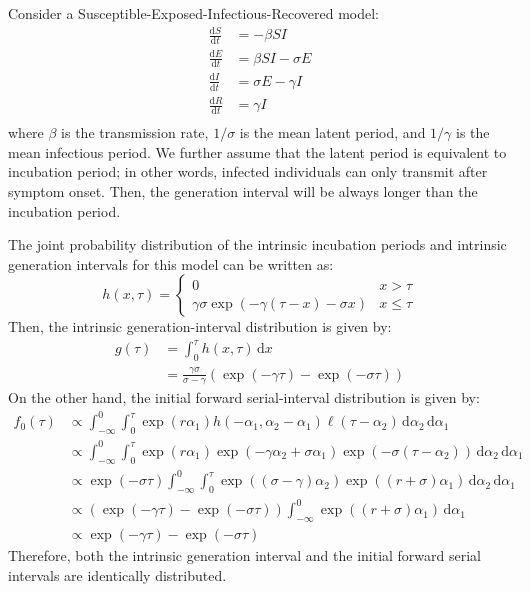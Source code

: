 \documentclass[12pt]{article}
\newcommand{\dd}[1]{\ensuremath{\, \mathrm{d}#1}}
\newcommand{\dx}{\dd{x}}
\newcommand{\pinf}{\ensuremath{\alpha_1}} %
\newcommand{\sinf}{\ensuremath{\alpha_2}} %
\newcommand{\idist}{\ell} %
\begin{document}
Consider a Susceptible-Exposed-Infectious-Recovered model:
\begin{equation}
\begin{aligned}
\frac{\mathrm{d}S}{\mathrm{d}t} &= - \beta S I\\
\frac{\mathrm{d}E}{\mathrm{d}t} &= \beta S I - \sigma E\\
\frac{\mathrm{d}I}{\mathrm{d}t} &= \sigma E - \gamma I \\
\frac{\mathrm{d}R}{\mathrm{d}t} &= \gamma I \\
\end{aligned}
\end{equation}
where $\beta$ is the transmission rate, $1/\sigma$ is the mean latent period, and $1/\gamma$ is the mean infectious period.
We further assume that the latent period is equivalent to incubation period; in other words, infected individuals can only transmit after symptom onset.
Then, the generation interval will be always longer than the incubation period.

The joint probability distribution of the intrinsic incubation periods and intrinsic generation intervals for this model can be written as:
\begin{equation}
h(x, \tau) = \begin{cases}
0 & x > \tau\\
\gamma \sigma \exp(-\gamma (\tau-x)-\sigma x) & x \leq \tau
\end{cases}
\end{equation}
Then, the intrinsic generation-interval distribution is given by:
\begin{equation}
\begin{aligned}
g(\tau) &= \int_0^\tau h(x, \tau) \dx\\
&= \frac{\gamma \sigma}{\sigma-\gamma} (\exp(-\gamma \tau) - \exp(-\sigma \tau))
\end{aligned}
\end{equation}
On the other hand, the initial forward serial-interval distribution is given by:
\begin{equation}
\begin{aligned}
f_{0}(\tau) &\propto \int_{-\infty}^{0} \int_{0}^{\tau} \exp(r \pinf) h(-\pinf, \sinf - \pinf) \idist(\tau - \sinf) \, \mathrm{d}\sinf\,\mathrm{d}\pinf\\
&\propto \int_{-\infty}^{0} \int_{0}^{\tau}\exp(r \pinf) \exp(-\gamma \sinf+ \sigma \pinf) \exp(-\sigma(\tau-\sinf)) \, \mathrm{d}\sinf\,\mathrm{d}\pinf\\
&\propto  \exp(-\sigma \tau) \int_{-\infty}^{0} \int_{0}^{\tau} \exp((\sigma-\gamma) \sinf) \exp((r+ \sigma) \pinf)\, \mathrm{d}\sinf\,\mathrm{d}\pinf\\
&\propto  (\exp(-\gamma \tau) - \exp(-\sigma \tau)) \int_{-\infty}^{0} \exp((r+ \sigma) \pinf)\,\mathrm{d}\pinf\\
&\propto  \exp(-\gamma \tau) - \exp(-\sigma \tau)
\end{aligned}
\end{equation}
Therefore, both the intrinsic generation interval and the initial forward serial intervals are identically distributed.

\pagebreak


\end{document}

